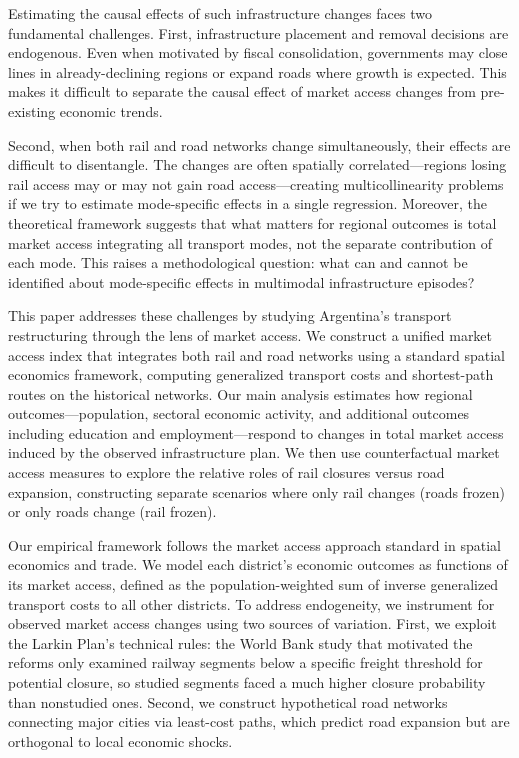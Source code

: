 Estimating the causal effects of such infrastructure changes faces
two fundamental challenges. First, infrastructure placement and
removal decisions are endogenous. Even when motivated by fiscal
consolidation, governments may close lines in already-declining
regions or expand roads where growth is expected. This makes it
difficult to separate the causal effect of market access changes
from pre-existing economic trends.

Second, when both rail and road networks change simultaneously, their
effects are difficult to disentangle. The changes are often spatially
correlated—regions losing rail access may or may not gain road
access—creating multicollinearity problems if we try to estimate
mode-specific effects in a single regression. Moreover, the
theoretical framework suggests that what matters for regional
outcomes is total market access integrating all transport modes, not
the separate contribution of each mode. This raises a methodological
question: what can and cannot be identified about mode-specific
effects in multimodal infrastructure episodes?

This paper addresses these challenges by studying Argentina's
transport restructuring through the lens of market access. We
construct a unified market access index that integrates both rail and
road networks using a standard spatial economics framework, computing
generalized transport costs and shortest-path routes on the historical
networks. Our main analysis estimates how regional outcomes—population,
sectoral economic activity, and additional outcomes including
education and employment—respond to changes in
total market access induced by the observed infrastructure plan. We
then use counterfactual market access measures to explore the relative
roles of rail closures versus road expansion, constructing separate
scenarios where only rail changes (roads frozen) or only roads change
(rail frozen).

Our empirical framework follows the market access approach standard
in spatial economics and trade. We model each district's economic
outcomes as functions of its market access, defined as the
population-weighted sum of inverse generalized transport costs to all
other districts. To address endogeneity, we instrument for observed
market access changes using two sources of variation. First, we
exploit the Larkin Plan's technical rules: the World Bank study that
motivated the reforms only examined railway segments below a specific
freight threshold for potential closure, so studied segments faced a
much higher closure probability than nonstudied ones. Second, we construct hypothetical road networks
connecting major cities via least-cost paths, which predict road
expansion but are orthogonal to local economic shocks.

